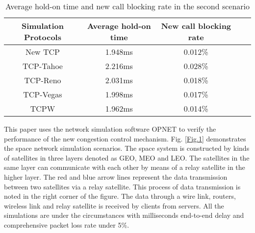 \documentclass[draftclsnofoot,onecolumn,11pt]{IEEEtran}
\begin{document}
\begin{table}[!t]
\centering
\caption{Average hold-on time and new call blocking rate in the second scenario}
\label{Table.2}
\begin{tabular}{||c|c|c|c|c||}
  \hline
 Simulation Protocols  &  Average hold-on time &  New call blocking rate \\
  \hline
New TCP& 1.948ms & 0.012\% \\
  \hline
TCP-Tahoe& 2.216ms& 0.028\% \\
  \hline
TCP-Reno& 2.031ms & 0.018\% \\
 \hline
TCP-Vegas&1.998ms & 0.017\%\\
 \hline
TCPW &1.962ms  & 0.014\%\\
 \hline
\end{tabular}
\end{table}
This paper uses the network simulation software OPNET to verify the performance of the new congestion control mechanism. Fig. \ref{Fig.1} demonstrates the space network simulation scenarios. The space system is constructed by kinds of satellites in three layers denoted as GEO, MEO and LEO. The satellites in the same layer can communicate with each other by means of a relay satellite in the higher layer. The red and blue arrow lines represent the data transmission between two satellites via a relay satellite. This process of data transmission is noted in the right corner of the figure. The data through a wire link, routers, wireless link and relay satellite is received by clients from servers. All the simulations are under the circumstances with milliseconds end-to-end delay and comprehensive packet loss rate under 5\%.
\end{document}
